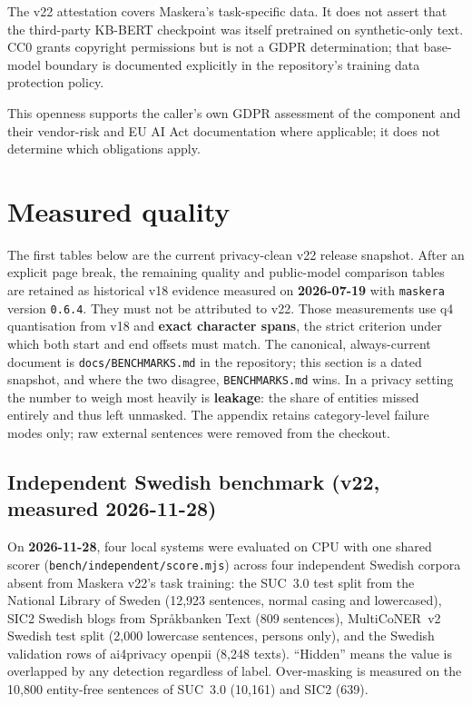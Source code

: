 \documentclass[10pt,a4paper]{article}
\newcommand{\pkg}[1]{\texttt{#1}}
\begin{document}
The v22 attestation covers Maskera's task-specific data. It does not assert that
the third-party KB-BERT checkpoint was itself pretrained on synthetic-only
text. CC0 grants copyright permissions but is not a GDPR determination; that
base-model boundary is documented explicitly in the repository's training
data protection policy.

This openness supports the caller's own GDPR assessment of the component
and their vendor-risk and EU AI Act documentation where applicable; it does
not determine which obligations apply.

\section{Measured quality}

The first tables below are the current privacy-clean v22 release snapshot.
After an explicit page break, the remaining quality and public-model
comparison tables are retained as historical v18 evidence measured on
\textbf{2026-07-19} with \pkg{maskera} version \pkg{0.6.4}. They must not be
attributed to v22. Those measurements use q4 quantisation from v18 and
\textbf{exact character spans}, the strict criterion under which both start
and end offsets must match. The canonical, always-current document is
\pkg{docs/}\allowbreak\pkg{BENCHMARKS.md} in
the repository; this section is a dated snapshot, and where the two disagree,
\pkg{BENCHMARKS.md} wins. In a privacy setting the number to weigh most
heavily is \textbf{leakage}: the share of entities missed entirely and thus
left unmasked. The appendix retains category-level failure modes only; raw
external sentences were removed from the checkout.

\subsection{Independent Swedish benchmark (v22, measured 2026-11-28)}

On \textbf{2026-11-28}, four local systems were evaluated on CPU with one shared
scorer (\pkg{bench/}\allowbreak\pkg{independent/}\allowbreak\pkg{score.mjs}) across four independent Swedish
corpora absent from Maskera v22's task training: the SUC~3.0 test split from the
National Library of Sweden (12,923 sentences, normal casing and lowercased),
SIC2 Swedish blogs from Spr\aa{}kbanken Text (809 sentences), MultiCoNER~v2
Swedish test split (2,000 lowercase sentences, persons only), and the Swedish
validation rows of ai4privacy openpii (8,248 texts). ``Hidden'' means the value
is overlapped by any detection regardless of label. Over-masking is measured on
the 10,800 entity-free sentences of SUC~3.0 (10,161) and SIC2 (639).
\end{document}
